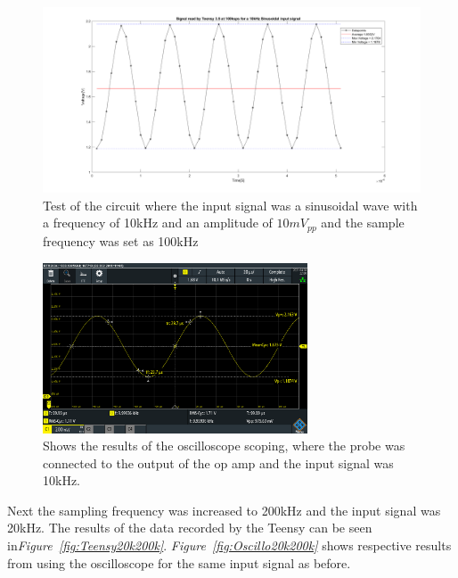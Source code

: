 \begin{figure}[h]
    \centering
    \includegraphics[width=1.0\textwidth]{graphics/10kin_100ksampl.png}
    \caption{Test of the circuit where the input signal was a sinusoidal wave with a frequency of 10kHz and an amplitude of $10mV_{pp}$ and the sample frequency was set as 100kHz}
    \label{fig:Teensy10k100k}
\end{figure}

\begin{figure}[h]
    \centering
    \includegraphics[width=0.7\textwidth]{graphics/10k10mvPP100ksamp.PNG}
    \caption{Shows the results of the oscilloscope scoping, where the probe was connected to the output of the op amp and the input signal was 10kHz.}
    \label{fig:Oscillo10k100k}
\end{figure}

\clearpage


Next the sampling frequency was increased to 200kHz and the input signal was 20kHz.
The results of the data recorded by the Teensy can be seen in\textit{Figure~\ref{fig:Teensy20k200k}}.
\textit{Figure~\ref{fig:Oscillo20k200k}} shows respective results from using the oscilloscope for the same input signal as before.

